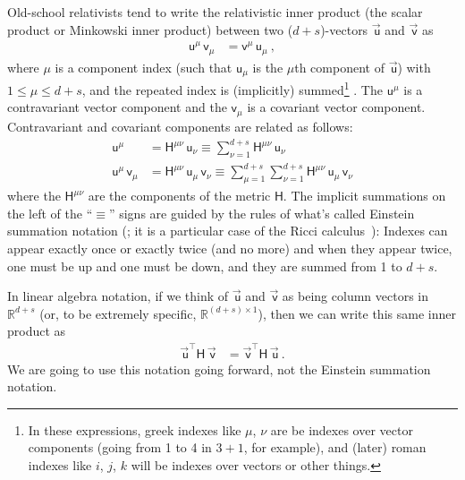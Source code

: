 \documentclass{article}
\newcommand{\metric}{\mathsf{H}}
\newcommand\upvec[1]{\!\vec{\,\mathrm{#1}}}
\newcommand{\Lvec}[1]{\upvec{\mathsf{#1}}} %
\newcommand{\Lblank}[1]{\mathsf{#1}} %
\newcommand{\plus}{\!+\!} %
\begin{document}
Old-school relativists tend to write the relativistic inner product (the scalar product or Minkowski inner product) between two ($d\plus s$)-vectors $\Lvec{u}$ and $\Lvec{v}$ as
\begin{align}
    \Lblank{u}^\mu\,\Lblank{v}_\mu &= \Lblank{v}^\mu\,\Lblank{u}_\mu ~,
\end{align}
where $\mu$ is a component index (such that $\Lblank{u}_\mu$ is the $\mu$th component of $\Lvec{u}$) with $1\leq\mu\leq d+s$, and the repeated index is (implicitly) summed\footnote{%
In these expressions, greek indexes like $\mu$, $\nu$ are be indexes over vector components (going from 1 to 4 in $3\plus1$, for example), and (later) roman indexes like $i$, $j$, $k$ will be indexes over vectors or other things.} .
The $\Lblank{u}^\mu$ is a contravariant vector component and the $\Lblank{v}_\mu$ is a covariant vector component.
Contravariant and covariant components are related as follows:
\begin{align}
    \Lblank{u}^\mu &= \metric^{\mu\nu}\,\Lblank{u}_\nu \equiv \sum_{\nu=1}^{d+s} \metric^{\mu\nu}\,\Lblank{u}_\nu
    \\
    \Lblank{u}^\mu\,\Lblank{v}_\mu &= \metric^{\mu\nu}\,\Lblank{u}_\mu\,\Lblank{v}_\nu \equiv \sum_{\mu=1}^{d+s}\sum_{\nu=1}^{d+s} \metric^{\mu\nu}\,\Lblank{u}_\mu\,\Lblank{v}_\nu
\end{align}
where the $\metric^{\mu\nu}$ are the components of the metric $\metric$.
The implicit summations on the left of the ``$\equiv$'' signs are guided by the rules of what's called Einstein summation notation (\cite{summation}; it is a particular case of the Ricci calculus~\cite{ricci}): Indexes can appear exactly once or exactly twice (and no more) and when they appear twice, one must be up and one must be down, and they are summed from 1 to $d+s$.

In linear algebra notation, if we think of $\Lvec{u}$ and $\Lvec{v}$ as being column vectors in $\mathbb{R}^{d+s}$ (or, to be extremely specific, $\mathbb{R}^{(d+s)\times 1}$), then we can write this same inner product as
\begin{align}\label{eq:inner}
    \Lvec{u}^\top\metric\,\Lvec{v} &= \Lvec{v}^\top\metric\,\Lvec{u} ~.
\end{align}
We are going to use this notation going forward, not the Einstein summation notation.
\end{document}
